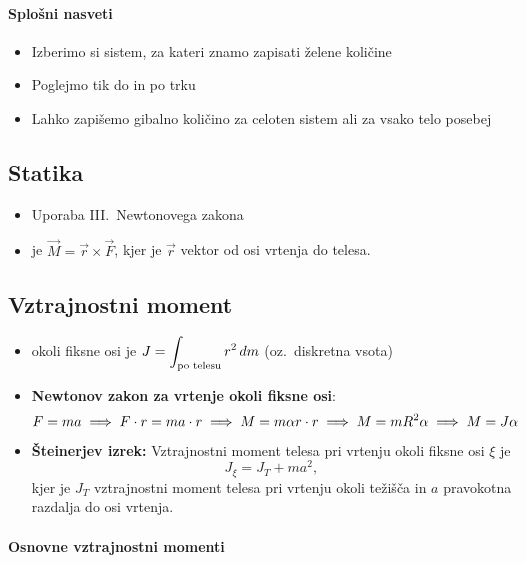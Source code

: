 \paragraph{Splošni nasveti}
\begin{itemize}
    \item Izberimo si sistem, za kateri znamo zapisati želene količine
    \item Poglejmo tik do in po trku
    \item Lahko zapišemo gibalno količino za celoten sistem ali za vsako telo posebej
\end{itemize}

\subsection{Statika}
\begin{itemize}
    \item Uporaba III.\ Newtonovega zakona
    \item {} je \(\vec{M} = \vec{r} \times \vec{F}\), kjer je \(\vec{r}\) vektor od osi vrtenja do telesa.
\end{itemize}

\subsection{Vztrajnostni moment}
\begin{itemize}
    \item {} okoli fiksne osi je \(\displaystyle J = \int_{\text{po telesu}} r^2 \, dm\) (oz.\ diskretna vsota)
    \item \textbf{Newtonov zakon za vrtenje okoli fiksne osi}: \[F = ma \implies F \cdot r = ma \cdot r \implies M = m \alpha r \cdot r \implies M = mR^2 \alpha \implies M = J\alpha\]
    \item \textbf{Šteinerjev izrek:} Vztrajnostni moment telesa pri vrtenju okoli fiksne osi \(\xi\) je \[J_\xi = J_T + ma^2,\]
    kjer je \(J_T\) vztrajnostni moment telesa pri vrtenju okoli težišča in \(a\) pravokotna razdalja do osi vrtenja.
\end{itemize}

\paragraph{Osnovne vztrajnostni momenti} \ 

